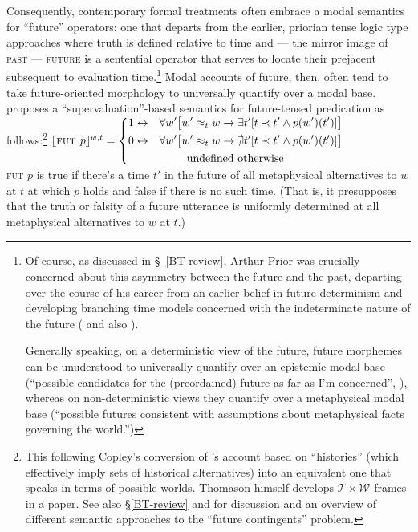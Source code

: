 Consequently, contemporary formal treatments often embrace a modal semantics for ``future'' operators: one that departs from the earlier, priorian tense logic type approaches where truth is defined relative to time and --- the mirror image of \textsc{past} --- \textsc{future} is a sentential operator that serves to locate their prejacent subsequent to evaluation time.\footnote{Of course, as discussed in \S~\ref{BT-review}, Arthur Prior was crucially concerned about this asymmetry between the future and the past, departing over the course of his career from an earlier belief in future determinism and developing branching time models concerned with the indeterminate nature of the future (\citealp[see][]{Copeland2020} and also \citealp[13]{Copley2009}).
	
	Generally speaking, on a deterministic view of the future, future morphemes can be unuderstood to universally quantify over an epistemic modal base (``possible candidates for the (preordained) future as far as I'm concerned'', \citealp[\textit{cf.}][]{Giannakidou2018}), whereas on non-deterministic views they quantify over a metaphysical modal base (``possible futures consistent with assumptions about metaphysical facts governing the world.'')} Modal accounts of future, then, often tend to take future-oriented morphology to universally quantify over a modal base. \citet[274]{Thomason1970} proposes a ``supervaluation''-based semantics for future-tensed predication as follows:\footnote{This following Copley's \citeyearpar[14]{Copley2009} conversion of \citeauthor{Thomason1970}'s account based on ``histories'' (which effectively imply sets of historical alternatives) into an equivalent one that speaks in terms of possible worlds. Thomason himself develops $ \mathcal{T\times W} $ frames in a \citeyear{Thomason1984} paper. See also \S\ref{BT-review} and \citep{Stojanovic2014} for discussion and an overview of different semantic approaches to the ``future contingents'' problem.}
\pex $ \denote[w,t]{\textsc{fut }p}=\left\{\begin{gathered}\begin{aligned} 1&\leftrightarrow &&\forall w'\big[w'\approx_t w \to\exists t' [t\prec t' \wedge p(w')(t')]\big]\\
0&\leftrightarrow &&\forall w'\big[w'\approx_t w \to\nexists t' [t\prec t' \wedge p(w')(t')]\big]
\end{aligned}\\
\text{undefined otherwise}\end{gathered}\right.
$\\[.5em]
\textsc{fut} $p$ is true if there's a time $ t' $ in the future of all metaphysical alternatives to $ w $ at $ t $ at which $ p $ holds and false if there is no such time. (That is, it presupposes that the truth or falsity of a future utterance is uniformly determined at all metaphysical alternatives to $ w $ at $ t $.)\xe

